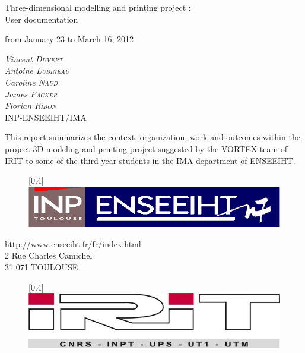 \documentclass{article}
\begin{document}
\bigskip
\bigskip
\bigskip
\bigskip
\bigskip
\bigskip
\bigskip
\bigskip

\begin{center}
\LARGE{Three-dimensional modelling and printing project :\\User documentation \\}
\bigskip
\bigskip\begin{tiny}
\end{tiny}
\Large{from January 23 to March 16, 2012}
\end{center}

\bigskip
\bigskip

\begin{center}
\large{
\textit{Vincent \textsc{Duvert} \\
Antoine \textsc{Lubineau} \\
Caroline \textsc{Naud} \\
James \textsc{Packer} \\
Florian \textsc{Ribon}} \\
\bigskip
INP-ENSEEIHT/IMA 
}
\end{center}

\bigskip
\bigskip

	This report summarizes the context, organization, work and outcomes within the project 3D modeling and printing project suggested by the VORTEX team of IRIT to some of the third-year students in the IMA department of ENSEEIHT.

\bigskip
\bigskip

\begin{figure}[!h]
\begin{center}
\scalebox{0.4}[0.4]{\includegraphics{./Images/enseeiht}}
\end{center}
\end{figure}

\bigskip

\begin{center}
http://www.enseeiht.fr/fr/index.html \\
2 Rue Charles Camichel \\
31 071 TOULOUSE
\end{center}

\bigskip

\begin{figure}[!h]
\begin{center}
\scalebox{0.4}[0.4]{\includegraphics{./Images/irit}}
\end{center}
\end{figure}
\end{document}
